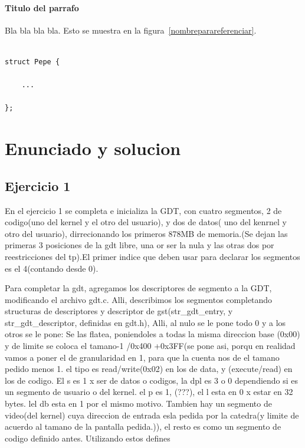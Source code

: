 \documentclass[a4paper]{article}
\newenvironment{codesnippet}{%
	\begin{Sbox}\begin{minipage}{\textwidth}\sffamily\small}%
	{\end{minipage}\end{Sbox}%
		\begin{center}%
		\vspace{-0.4cm}\colorbox{litegrey}{\TheSbox}\end{center}\vspace{0.3cm}}
\begin{document}
\paragraph{\textbf{Titulo del parrafo} } Bla bla bla bla.
Esto se muestra en la figura~\ref{nombreparareferenciar}.



\begin{codesnippet}
\begin{verbatim}

struct Pepe {

    ...

};

\end{verbatim}
\end{codesnippet}


\section{Enunciado y solucion} 



\subsection{Ejercicio 1}

En el ejercicio 1 se completa e inicializa la GDT, con cuatro segmentos, 2 de codigo(uno del kernel y el otro del usuario), y dos de datos( uno del kenrnel y otro del usuario), dirrecionando los primeros 878MB de memoria.(Se dejan las primeras 3 posiciones de la gdt libre, una or ser la nula y las otras dos por reestricciones del tp).El primer indice que deben usar para declarar los segmentos es el 4(contando desde 0).




Para completar la gdt, agregamos los descriptores de segmento a la GDT, modificando el archivo gdt.c.
Alli, describimos los segmentos completando  structuras de descriptores y descriptor de gst(str_gdt_entry, y  str_gdt_descriptor, definidas en gdt.h),
Alli, al nulo se le pone todo 0 y a los otros se le pone:
Se las flatea, poniendoles a todas la misma direccion base (0x00) y de limite se coloca el tamano-1 /0x400 +0x3FF(se pone asi, porqu en realidad vamos a poner el de granularidad en 1, para que la cuenta nos de el tamano pedido menos 1.
el tipo es read/write(0x02) en los de data, y (execute/read) en los de codigo. El s es 1 x ser de datos o codigos,  la dpl es 3 o 0 dependiendo si es un segmento de usuario o del kernel. el p es 1, (???), el l esta en 0 x estar en 32 bytes. lel db esta en 1 por el mismo motivo. 
Tambien hay un segmento de video(del kernel) cuya direccion de entrada esla pedida por la catedra(y limite de acuerdo al tamano de la pantalla pedida.)), el resto es como un segmento de codigo definido antes.
Utilizando estos defines
\end{document}
